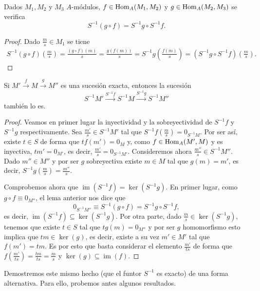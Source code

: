 \documentclass[../main.tex]{subfiles}
\begin{document}
	\begin{lemma}
		Dados $M_1, M_2$ y $M_3$ $A$-módulos, $f\in\operatorname{Hom}_A(M_1,M_2)$ y $g\in\operatorname{Hom}_A(M_2,M_3)$ se verifica
		$$S^{-1}(g\circ f)=S^{-1}g\circ S^{-1}f.$$
	\end{lemma}

	\begin{proof}
		Dado $\frac{m}{s}\in M_1$ se tiene
		\begin{align*}
		S^{-1}(g\circ f)\left(\frac{m}{s}\right)=\frac{(g\circ f)(m)}{s}=\frac{g(f(m))}{s}=S^{-1}{g}\left(\frac{f(m)}{s}\right)=(S^{-1}{g}\circ S^{-1}{f})\left(\frac{m}{s}\right).
		\end{align*}
	\end{proof}

	\begin{proposition}
		Si $M'\overset{f}{\longrightarrow}M\overset{g}{\longrightarrow}M''$ es una sucesión exacta, entonces la sucesión $$S^{-1}M'\overset{S^{-1}f}{\longrightarrow}S^{-1}M\overset{S^{-1}g}{\longrightarrow}S^{-1}M''$$ también lo es.
	\end{proposition}

	\begin{proof}
		Veamos en primer lugar la inyectividad y la sobreyectividad de $S^{-1}f$ y $S^{-1}g$ respectivamente. Sea $\frac{m'}{s}\in S^{-1}M'$ tal que $S^{-1}f\left(\frac{m}{s}\right)=0_{S^{-1}M}$. Por ser así, existe $t\in S$ de forma que $tf(m')=0_M$ y, como $f\in\operatorname{Hom}_A(M',M)$ y es inyectiva, $tm'=0_{M'}$, es decir, $\frac{m'}{s}=0_{S^{-1}M'}$.
		Consideremos ahora $\frac{m''}{s}\in S^{-1}M''$. Dado $m''\in M''$ y por ser $g$ sobreyectiva existe $m\in M$ tal que $g(m)=m'$, es decir, $S^{-1}g\left(\frac{m}{s}\right)=\frac{m''}{s}$.

		Comprobemos ahora que $\operatorname{im}(S^{-1}f)=\ker (S^{-1}g)$. En primer lugar, como $g\circ f\equiv 0_{M''}$, el lema anterior nos dice que
		$$0_{S^{-1} M''}\equiv S^{-1}(g\circ f)=S^{-1} g\circ S^{-1} f,$$
		es decir, $\operatorname{im} (S^{-1}f)\subseteq \ker(S^{-1}g)$. Por otra parte, dado $\frac{m}{s}\in\ker(S^{-1}g)$, tenemos que existe $t\in S$ tal que $tg(m)=0_{M''}$ y por ser $g$ homomorfismo esto implica que $tm\in\ker(g)$, es decir, existe a su vez $m'\in M'$ tal que $f(m')=tm$. Es por esto que basta considerar el elemento $\frac{m'}{ts}$ de forma que $f(\frac{m'}{ts})=\frac{tm}{ts}=\frac{m}{s}$ y $\ker(g)\subseteq\operatorname{im}(f)$.
	\end{proof}

	Demostremos este mismo hecho (que el funtor $S^{-1}$ es exacto) de una forma alternativa. Para ello, probemos antes algunos resultados.
\end{document}

